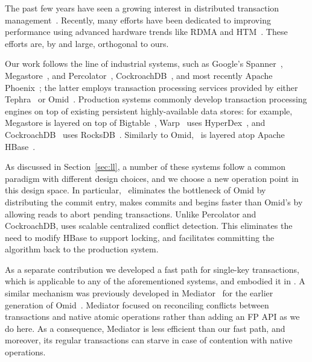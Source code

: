 

The past few years have seen a growing interest in distributed 
transaction management~\cite{PattersonENAA12,Cowling2012,Aguilera2015,Balakrishnan2013,Thomson2012,eyal2013ordering,Warp}.
Recently, many efforts have been dedicated to improving performance using advanced 
hardware trends like RDMA and HTM~\cite{Wei2015,Dragojevic2014,Dragojevic2015}.  
These efforts are, by and large, orthogonal to ours.

Our work follows the line of industrial systems, such as 
Google's Spanner~\cite{Spanner2012}, Megastore~\cite{Megastore}, and Percolator~\cite{Percolator2010}, 
CockroachDB~\cite{cockroach}, and most recently Apache Phoenix~\cite{phoenix}; 
the latter employs 
transaction processing services provided by either Tephra~\cite{tephra} or Omid~\cite{Omid2017}. 
Production systems commonly develop transaction processing engines on top of existing persistent 
highly-available data stores: for example, Megastore is layered on top of
Bigtable~\cite{Chang2008}, Warp~\cite{Warp} uses HyperDex~\cite{Escriva2012}, 
and CockroachDB~\cite{cockroach} uses RocksDB~\cite{rocksdb}.
Similarly to Omid, \sys\ is layered atop Apache HBase~\cite{hbase}.

As discussed in Section~\ref{sec:ll}, a number of these systems follow a common paradigm
with different design choices, and we choose a new operation point in 
this design space. In particular, \sysll\ eliminates the bottleneck of Omid by
distributing the commit entry, makes commits and begins faster than Omid's by 
allowing reads to abort pending transactions. Unlike Percolator and CockroachDB, 
\sysll\/ uses scalable centralized conflict detection. This eliminates the need to modify 
HBase to support locking, and facilitates committing the algorithm back 
to the production system. 



As a separate contribution we developed a fast path for single-key transactions,
which is applicable to any of the aforementioned systems, and embodied it in \sys. A similar mechanism 
was previously developed in Mediator~\cite{mediator} for the earlier generation 
of Omid~\cite{OmidICDE2014}. Mediator focused on reconciling conflicts between 
transactions and native atomic operations rather than adding an FP API as we do here. 
As a consequence, Mediator is less efficient than our fast path, and moreover, 
its regular transactions can starve in case 
of contention with native operations. 

